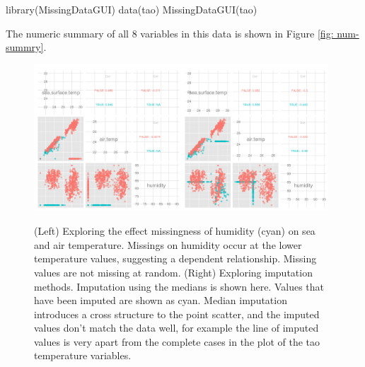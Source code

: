 \documentclass[article]{jss}
\begin{document}
\begin{Code}
library(MissingDataGUI)
data(tao)
MissingDataGUI(tao)
\end{Code}

The numeric summary of all 8 variables in this data is shown in Figure \ref{fig: num-summry}.


\begin{figure}[htp]
\centerline{\includegraphics[width=0.49\textwidth]{tao1_pairwise.png}\includegraphics[width=0.49\textwidth]{tao2_pairwise.png}}
\caption{(Left) Exploring the effect missingness of humidity (cyan) on sea and air temperature. Missings on humidity occur at the lower temperature values, suggesting a dependent relationship. Missing values are not missing at random. (Right) Exploring imputation methods. Imputation using the medians is shown here. Values that have been imputed are shown as cyan. Median imputation introduces a cross structure to the point scatter, and the imputed values don't match the data well, for example the line of imputed values is very apart from the complete cases in the plot of the tao temperature variables.}
\label{tao1}
\end{figure}
\end{document}
